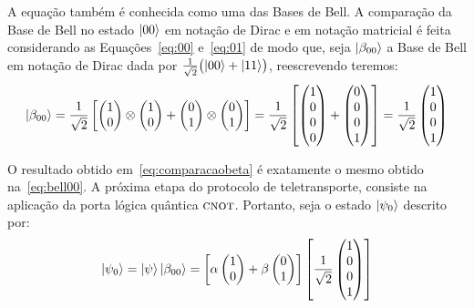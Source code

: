A equação também é conhecida como uma das Bases de Bell. A comparação da Base de Bell no estado $\ket{00}$ em notação de Dirac e em notação matricial é feita considerando as Equações~\eqref{eq:00} e~\eqref{eq:01} de modo que, seja \(\ket{\beta_{00}}\) a Base de Bell em notação de Dirac dada por \(\frac{1}{\sqrt{2}} \bigl(\ket{00} + \ket{11}\bigr)\), reescrevendo teremos:
\begin{equation}\label{eq:comparacaobeta}
\ket{\beta_{00}} = \frac{1}{\sqrt{2}} \left[ \begin{pmatrix}
1 \\
0
\end{pmatrix} \otimes \begin{pmatrix}
1 \\
0
\end{pmatrix} + \begin{pmatrix}
0 \\
1
\end{pmatrix} \otimes \begin{pmatrix}
0 \\
1
\end{pmatrix}\right] = \frac{1}{\sqrt{2}} \left[ \begin{pmatrix}
1 \\
0 \\
0 \\
0 
\end{pmatrix} + \begin{pmatrix}
0 \\
0 \\
0 \\
1 
\end{pmatrix}\right] = \frac{1}{\sqrt{2}} \begin{pmatrix}
1 \\
0 \\
0 \\
1 
\end{pmatrix}
\end{equation}

O resultado obtido em~\eqref{eq:comparacaobeta} é exatamente o mesmo obtido na~\eqref{eq:bell00}.
A próxima etapa do protocolo de teletransporte, consiste na aplicação da porta lógica quântica \(\operatorname{\textsc{cnot}}\). Portanto, seja o estado $\ket{\psi_0}$ descrito por:
\begin{equation}\label{eq:psi0}
\ket{\psi_0}=\ket{\psi}\ket{\beta_{00}}=\left[\alpha \begin{pmatrix}
1 \\
0 
\end{pmatrix} + \beta \begin{pmatrix}
0 \\
1
\end{pmatrix}\right] \left[\frac{1}{\sqrt{2}} \begin{pmatrix}
1 \\
0 \\
0 \\
1
\end{pmatrix}\right]
\end{equation}

